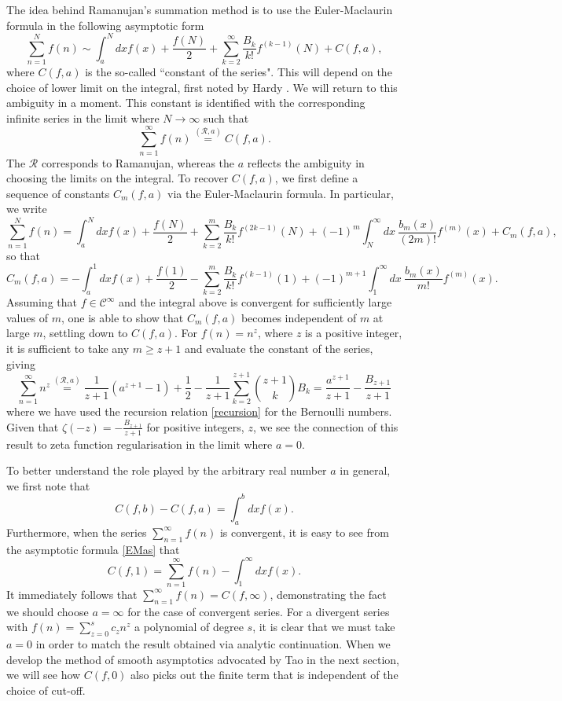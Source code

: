 \documentclass[11pt, letter]{article}
\def\be{\begin{equation}}
\def\ee{\end{equation}}
\newcommand{\Rcal}{\mathcal{R}}
\begin{document}
The idea behind Ramanujan's summation method is to use the Euler-Maclaurin formula in the following asymptotic form
\be \label{EMas}
\sum_{n=1}^N f(n) \sim \int^N_a dx f(x) + \frac{f(N)}{2}+ \sum \limits_{k=2}^{\infty}  \frac{B_{k}}{k!} f^{(k-1)}(N)+C(f, a),
\ee
where $C(f, a)$  is the so-called ``constant of  the series".  This will depend on the choice of  lower limit on the integral, first 
noted by Hardy \cite{Hardy73}. We will return to this ambiguity in a moment. This constant is identified with the corresponding  infinite series in the limit where $N \to \infty$ such that
\be
\sum_{n=1}^\infty f(n) \overset{(\mathcal{R}, a)}{=} C(f, a).
\ee
The $\Rcal$ corresponds  to Ramanujan, whereas the $a$ reflects the ambiguity in choosing the limits on the integral. To recover $C(f, a)$, we first  define a sequence of constants $C_m(f,a)$ via the Euler-Maclaurin formula. In particular, we write
\be
\sum_{n=1}^N f(n) = \int^N_a dx f(x) + \frac{f(N)}{2}+\sum \limits_{k=2}^m   \frac{B_{k}}{k!} f^{(2k-1)}(N)+(-1)^m \int^\infty_N dx \ \frac{b_{m}(x)}{(2m)!} f^{(m)}(x)+C_m(f, a),
\ee
so that 
\be
C_m(f, a)=-\int^1_a dx f(x) + \frac{f(1)}{2}-\sum \limits_{k=2}^m    \frac{B_{k}}{k!} f^{(k-1)}(1)+(-1)^{m+1}\int^\infty_1 dx \ \frac{b_{m}(x)}{m!} f^{(m)}(x).
\ee
Assuming that $f \in \mathcal{C}^\infty$ and the integral above is  convergent for sufficiently large values of $m$,  one is able to show that $C_m(f, a)$ becomes independent of $m$ at large $m$, settling down to  $C(f, a)$. For $f(n)=n^z$, where $z$ is a positive integer,  it is sufficient to take any $m \geq z+1$ and evaluate the constant of the series, giving 
\be \label{Intnz}
\sum_{n=1}^\infty n^z \overset{(\mathcal{R}, a)}{=} \frac{1}{z+1} (a^{z+1}-1)+\frac12 - \frac{1}{z+1}\sum \limits_{k=2}^{z+1}   \binom{z+1}{ k} B_{k}=\frac{a^{z+1}}{z+1}-\frac{B_{z+1}}{z+1}
\ee
where we have used the recursion relation \eqref{recursion} for the Bernoulli numbers. Given that $\zeta(-z)=-\frac{B_{z+1}}{z+1}$ for positive integers, $z$,  we see the connection of this result to zeta function regularisation in the limit where  $a=0$.


To better understand the role played by the arbitrary real number $a$ in general, we first note that
\be
C(f, b)-C(f, a)=\int_a^b dx f(x).
\ee
Furthermore, when the series $\sum_{n=1}^\infty f(n)$ is convergent, it is easy to see from the asymptotic formula \eqref{EMas} that \cite{Candelpergher17}
\be
C(f, 1)=\sum_{n=1}^\infty f(n) - \int^\infty_1 dx f(x).
\ee
It immediately follows that $\sum_{n=1}^\infty f(n) =C(f, \infty)$, demonstrating the fact we should choose $a=\infty$ for the case of convergent series. For a divergent series with  $f(n)=\sum_{z=0}^s c_z n^z$ a polynomial of degree  $s$,  it is clear that we must take $a=0$ in order to match the result obtained via analytic continuation.  When we develop the method of smooth asymptotics advocated by Tao \cite{Tao11} in the next section, we will see how $C(f, 0)$ also picks out the finite term that is independent of the choice of cut-off. 
\end{document}
